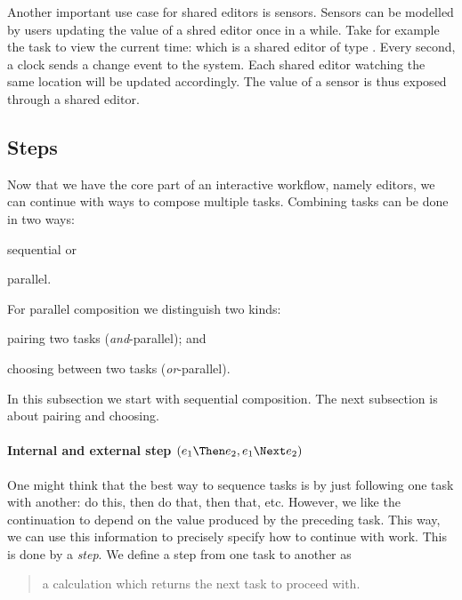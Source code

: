 \label{sub:time}
Another important use case for shared editors is sensors.
Sensors can be modelled by users updating the value of a shred editor once in a while.
Take for example the task to view the current time: 
which is a shared editor of type .
Every second, a clock sends a change event to the system.
Each shared editor watching the same location will be updated accordingly.
The value of a sensor is thus exposed through a shared editor.



\subsection{Steps}


Now that we have the core part of an interactive workflow,
namely editors,
we can continue with ways to compose multiple tasks.
Combining tasks can be done in two ways:
\begin{enumerate*}
  \item sequential or
  \item parallel.
\end{enumerate*}
For parallel composition we distinguish two kinds:
\begin{enumerate*}[(a)]
  \item pairing two tasks (\emph{and}-parallel); and
  \item choosing between two tasks (\emph{or}-parallel).
\end{enumerate*}
In this subsection we start with sequential composition.
The next subsection is about pairing and choosing.



\paragraph{Internal and external step $(e_1 \Then e_2, e_1 \Next e_2)$}

One might think that the best way to sequence tasks is by just following one task with another:
do this, then do that, then that, etc.
However, we like the continuation to depend on the value produced by the preceding task.
This way, we can use this information to precisely specify how to continue with work.
This is done by a \emph{step}.
We define a step from one task to another as
\begin{quote}
  a calculation which returns the next task to proceed with.
\end{quote}

